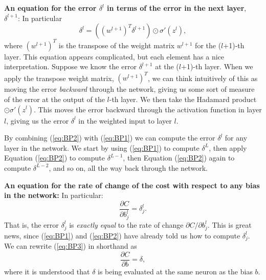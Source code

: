 \documentclass[a4paper,twoside,10pt]{book}
\begin{document}
\textbf{An equation for the error $\delta^l$ in terms of the error in the next layer}, $\delta^{l+1}$: In particular
\begin{equation}
	\delta^l = ((w^{l+1})^T \delta^{l+1}) \odot \sigma'(z^l),
	\tag{BP2}\label{eq:BP2}
\end{equation}
where $(w^{l+1})^T$ is the transpose of the weight matrix $w^{l+1}$ for the ($l$+1)-th layer. This equation appears complicated, but each element has a nice interpretation. Suppose we know the error $\delta^{l+1}$ at the ($l$+1)-th layer. When we apply the transpose weight matrix, $(w^{l+1})^T$, we can think intuitively of this as moving the error \textit{backward} through the network, giving us some sort of measure of the error at the output of the $l$-th layer. We then take the Hadamard product $\odot \sigma'(z^l)$. This moves the error backward through the activation function in layer $l$, giving us the error $\delta^l$ in the weighted input to layer $l$.

By combining (\ref{eq:BP2}) with (\ref{eq:BP1}) we can compute the error $\delta^l$ for any layer in the network. We start by using (\ref{eq:BP1}) to compute $\delta^L$, then apply Equation (\ref{eq:BP2}) to compute $\delta^{L-1}$, then Equation (\ref{eq:BP2}) again to compute $\delta^{L-2}$, and so on, all the way back through the network.

\textbf{An equation for the rate of change of the cost with respect to any bias in the network:} In particular:
\begin{equation}
\frac{\partial C}{\partial b^l_j} = \delta^l_j.
\tag{BP3}\label{eq:BP3}
\end{equation}
That is, the error $\delta^l_j$ is \textit{exactly equal} to the rate of change $\partial{}C/\partial{}b^l_j$. This is great news, since (\ref{eq:BP1}) and (\ref{eq:BP2}) have already told us how to compute $\delta^l_j$. We can rewrite (\ref{eq:BP3}) in shorthand as
\begin{equation}
\frac{\partial C}{\partial b} = \delta,\tag{31}\label{eq:31}
\end{equation}
where it is understood that $\delta$ is being evaluated at the same neuron as the bias $b$.
\end{document}
